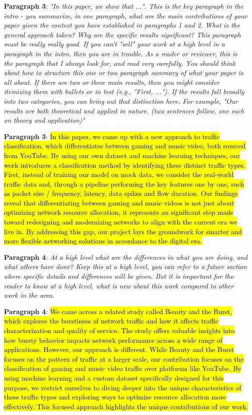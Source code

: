 \textbf{Paragraph 3}: \textit{"In this paper, we show that ...". This is the key paragraph in the intro - you summarize, in one paragraph, what are the main contributions of your paper given the context you have established in paragraphs 1 and 2. What is the general approach taken? Why are the specific results significant? This paragraph must be really really good. If you can't "sell" your work at a high level in a paragraph in the intro, then you are in trouble. As a reader or reviewer, this is the paragraph that I always look for, and read very carefully.
You should think about how to structure this one or two paragraph summary of what your paper is all about. If there are two or three main results, then you might consider itemizing them with bullets or in test (e.g., "First, ..."). If the results fall broadly into two categories, you can bring out that distinction here. For example, "Our results are both theoretical and applied in nature. (two sentences follow, one each on theory and application)"}

\textbf{Paragraph 3}: \hl{In this paper, we came up with a new approach to traffic classification, which differentiates between gaming and music video, both sourced from YouTube. By using our own dataset and machine learning techniques, our work introduces a classification method by identifying these distinct traffic types. First, instead of training our model on mock data, we consider the real-world traffic data and, through a pipeline performing the key features one by one, such as packet size / frequency, latency, data spikes and flow duration. Our findings reveal that differentiating between gaming and music videos is not just about optimizing network resource allocation, it represents an significant step made toward redesigning and modernizing networks to align with the current era we live in. By addressing this gap, our project lays the groundwork for  smarter and more flexible networking solutions in accordance to the digital era.}

\textbf{Paragraph 4}: \textit{At a high level what are the differences in what you are doing, and what others have done? Keep this at a high level, you can refer to a future section where specific details and differences will be given. But it is important for the reader to know at a high level, what is new about this work compared to other work in the area.}

\textbf{Paragraph 4}: \hl{We came across a related study called Beauty and the Burst, which explores the burstiness of network traffic and how it affects traffic characterization and quality of service. The study offers valuable insights into how bursty behavior impacts network performance across a wide range of applications. However, our approach is different. While Beauty and the Burst focuses on the pattern of traffic at a larger scale, our contribution focuses on the classification of gaming and music video traffic over platforms like YouTube. By using machine learning and a custom dataset specifically designed for this purpose, we restrict ourselves to diving deeper into the unique characteristics of these traffic types and exploring ways to optimize resource allocation more effectively. This focused approach highlights the unique contributions of our work.}

